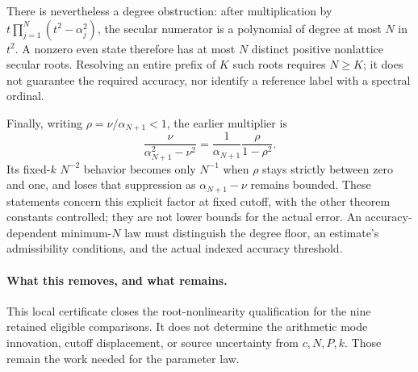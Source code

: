 There is nevertheless a degree obstruction: after multiplication by
$t\prod_{j=1}^N(t^2-\alpha_j^2)$, the secular numerator is a polynomial
of degree at most $N$ in $t^2$. A nonzero even state therefore has at
most $N$ distinct positive nonlattice secular roots. Resolving an entire
prefix of $K$ such roots requires $N\ge K$; it does not guarantee the
required accuracy, nor identify a reference label with a spectral ordinal.

Finally, writing $\rho=\nu/\alpha_{N+1}<1$, the earlier multiplier is
\[
 \frac{\nu}{\alpha_{N+1}^2-\nu^2}
 =\frac1{\alpha_{N+1}}\frac{\rho}{1-\rho^2}.
\]
Its fixed-$k$ $N^{-2}$ behavior becomes only $N^{-1}$ when $\rho$ stays
strictly between zero and one, and loses that suppression as
$\alpha_{N+1}-\nu$ remains bounded. These statements concern this explicit
factor at fixed cutoff, with the other theorem constants controlled;
they are not lower bounds for the actual error. An accuracy-dependent
minimum-$N$ law must distinguish the degree floor, an estimate's
admissibility conditions, and the actual indexed accuracy threshold.

\paragraph{What this removes, and what remains.}
This local certificate closes the root-nonlinearity qualification for
the nine retained eligible comparisons. It does not determine the
arithmetic mode innovation, cutoff displacement, or source uncertainty
from $c,N,P,k$. Those remain the work needed for the parameter law.
